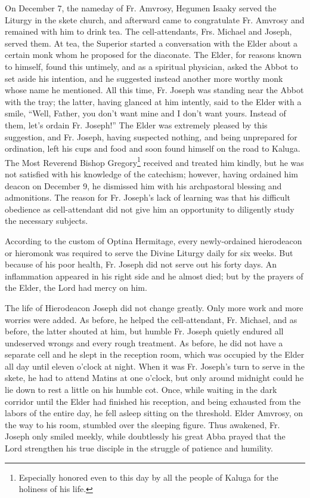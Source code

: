 On December 7, the nameday of Fr. Amvrosy, Hegumen Isaaky served the Liturgy in the skete church, and afterward came to congratulate Fr. Amvrosy and remained with him to drink tea. The cell-attendants, Frs. Michael and Joseph, served them. At tea, the Superior started a conversation with the Elder about a certain monk whom he proposed for the diaconate. The Elder, for reasons known to himself, found this untimely, and as a spiritual physician, asked the Abbot to set aside his intention, and he suggested instead another more worthy monk whose name he mentioned. All this time, Fr. Joseph was standing near the Abbot with the tray; the latter, having glanced at him intently, said to the Elder with a smile, ``Well, Father, you don't want mine and I don't want yours. Instead of them, let's ordain Fr. Joseph!'' The Elder was extremely pleased by this suggestion, and Fr. Joseph, having suspected nothing, and being unprepared for ordination, left his cups and food and soon found himself on the road to Kaluga. The Most Reverend Bishop Gregory\footnote{Especially honored even to this day by all the people of Kaluga for the holiness of his life.} received and treated him kindly, but he was not satisfied with his knowledge of the catechism; however, having ordained him deacon on December 9, he dismissed him with his archpastoral blessing and admonitions. The reason for Fr. Joseph's lack of learning was that his difficult obedience as cell-attendant did not give him an opportunity to diligently study the necessary subjects.

According to the custom of Optina Hermitage, every newly-ordained hierodeacon or hieromonk was required to serve the Divine Liturgy daily for six weeks. But because of his poor health, Fr. Joseph did not serve out his forty days. An inflammation appeared in his right side and he almost died; but by the prayers of the Elder, the Lord had mercy on him.

The life of Hierodeacon Joseph did not change greatly. Only more work and more worries were added. As before, he helped the cell-attendant, Fr. Michael, and as before, the latter shouted at him, but humble Fr. Joseph quietly endured all undeserved wrongs and every rough treatment. As before, he did not have a separate cell and he slept in the reception room, which was occupied by the Elder all day until eleven o'clock at night. When it was Fr. Joseph's turn to serve in the skete, he had to attend Matins at one o'clock, but only around midnight could he lie down to rest a little on his humble cot. Once, while waiting in the dark corridor until the Elder had finished his reception, and being exhausted from the labors of the entire day, he fell asleep sitting on the threshold. Elder Amvrosy, on the way to his room, stumbled over the sleeping figure. Thus awakened, Fr. Joseph only smiled meekly, while doubtlessly his great Abba prayed that the Lord strengthen his true disciple in the struggle of patience and humility.

